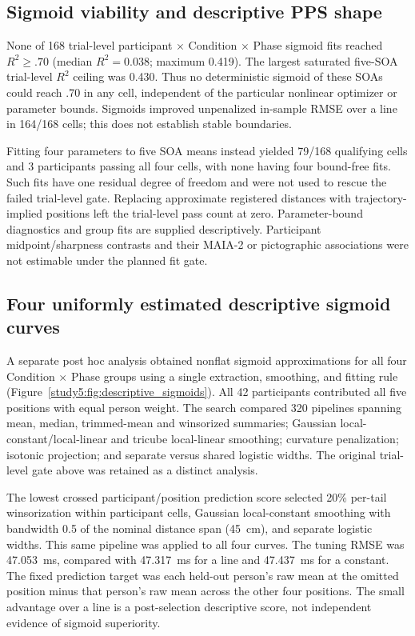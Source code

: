 \subsection{Sigmoid viability and descriptive PPS shape}

None of 168 trial-level participant $\times$ Condition $\times$ Phase sigmoid fits reached $R^{2}\geq .70$ (median $R^{2}=0.038$; maximum 0.419). The largest saturated five-SOA trial-level $R^{2}$ ceiling was 0.430. Thus no deterministic sigmoid of these SOAs could reach .70 in any cell, independent of the particular nonlinear optimizer or parameter bounds. Sigmoids improved unpenalized in-sample RMSE over a line in 164/168 cells; this does not establish stable boundaries.

Fitting four parameters to five SOA means instead yielded 79/168 qualifying cells and 3 participants passing all four cells, with none having four bound-free fits. Such fits have one residual degree of freedom and were not used to rescue the failed trial-level gate. Replacing approximate registered distances with trajectory-implied positions left the trial-level pass count at zero. Parameter-bound diagnostics and group fits are supplied descriptively. Participant midpoint/sharpness contrasts and their MAIA-2 or pictographic associations were not estimable under the planned fit gate.

\subsection{Four uniformly estimated descriptive sigmoid curves}

A separate post hoc analysis obtained nonflat sigmoid approximations for all four Condition $\times$ Phase groups using a single extraction, smoothing, and fitting rule (Figure~\ref{study5:fig:descriptive_sigmoids}). All 42 participants contributed all five positions with equal person weight. The search compared 320 pipelines spanning mean, median, trimmed-mean and winsorized summaries; Gaussian local-constant/local-linear and tricube local-linear smoothing; curvature penalization; isotonic projection; and separate versus shared logistic widths. The original trial-level gate above was retained as a distinct analysis.

The lowest crossed participant/position prediction score selected 20\% per-tail winsorization within participant cells, Gaussian local-constant smoothing with bandwidth 0.5 of the nominal distance span (45~cm), and separate logistic widths. This same pipeline was applied to all four curves. The tuning RMSE was 47.053~ms, compared with 47.317~ms for a line and 47.437~ms for a constant. The fixed prediction target was each held-out person's raw mean at the omitted position minus that person's raw mean across the other four positions. The small advantage over a line is a post-selection descriptive score, not independent evidence of sigmoid superiority.

